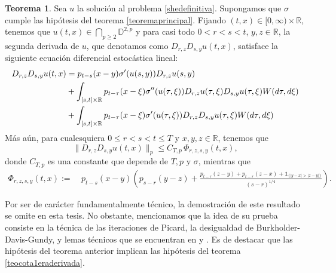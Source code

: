 \documentclass[letterpaper,twoside,12pt]{book}
\newcommand{\R}{\mathbb{R}}
\newcommand{\D}{\mathbb{D}}
\newcommand{\1}{\mathds{1}}
\newcommand{\abs}[1]{\left\lvert #1 \right\rvert}
\theoremstyle{definition}
\theoremstyle{definition}
\newtheorem{teo}{Teorema}
\theoremstyle{remark}
\theoremstyle{definition}
\theoremstyle{definition}
\theoremstyle{definition}
\theoremstyle{definition}
\theoremstyle{definition}
\begin{document}
 \begin{teo}\label{teocota2daderivada}
   Sea $u$ la solución al problema \eqref{shedefinitiva}. Supongamos que $\sigma$ cumple las hipótesis del teorema \ref{teoremaprincipal}. Fijando $(t,x)\in [0,\infty)\times \R$, tenemos que $u(t,x)\in \bigcap_{p\geq2}\D^{2,p}$ y para casi todo $0<r<s<t$, $y,z\in \R$, la segunda derivada de $u$, que denotamos como $D_{r,z}D_{s,y}u(t,x)$, satisface la siguiente ecuación diferencial estocástica lineal:
   \begin{align}
      D_{r,z}D_{s,y}u(t,x)&=p_{t-s}(x-y)\sigma'(u(s,y))D_{r,z}u(s,y)\notag\\
      &+\int_{[s,t]\times \R}p_{t-\tau}(x-\xi)\sigma''(u(\tau,\xi))D_{r,z}u(\tau,\xi)D_{s,y}u(\tau,\xi)W(d\tau,d\xi)\notag\\
      &+\int_{[s,t]\times \R}p_{t-\tau}(x-\xi)\sigma'(u(\tau,\xi))D_{r,z}D_{s,y}u(\tau,\xi)W(d\tau,d\xi)\label{formula2daderivada}
   \end{align}
   Más aún, para cualesquiera $0\leq r<s<t\leq T$  y $x,y,z\in \R$, tenemos que 
   \begin{equation}\label{cota2daderivada}
         \|D_{r,z}D_{s,y}u(t,x)\|_p\leq C_{T,p \ }\Phi_{r,z,s,y}(t,x),
   \end{equation}
   donde $C_{T,p}$ es una constante que depende de $T,p$ y $\sigma$, mientras que
      \begin{align*}
          \Phi_{r,z,s,y}(t,x):= & \ p_{t-s}(x-y)\left(p_{s-r}(y-z)+\frac{p_{t-r}(z-y)+p_{t-r}(z-x)+\1_{\{\abs{y-x}>\abs{z-y}\}}}{(s-r)^{1/4}}\right).
      \end{align*} 
   \end{teo}
   Por ser de carácter fundamentalmente técnico, la demostración de este resultado se omite en esta tesis. No obstante, mencionamos que la idea de su prueba consiste en la técnica de las iteraciones de Picard, la desigualdad de Burkholder-Davis-Gundy, y lemas técnicos que se encuentran en \cite[lema A.1]{HUANG20207170} y \cite[lema A.1, lema A.2]{KUZGUN202268}. Es de destacar que las hipótesis del teorema anterior implican las hipótesis del teorema \ref{teocota1eraderivada}.
\end{document}
